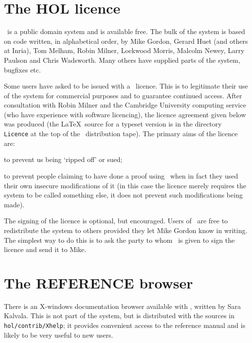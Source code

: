 {\section{The HOL licence}

\HOL\ is a public domain system and is available free. The bulk of the system
is based on code written, in alphabetical order, by Mike Gordon,
Gerard Huet (and others at Inria), Tom Melham, Robin Milner, Lockwood
Morris, Malcolm Newey, Larry Paulson and Chris Wadsworth. Many others
have supplied parts of the system, bugfixes etc.

Some users have asked to be issued with a \HOL\ licence.  This is to
legitimate their use of the system for commercial purposes and to
guarantee continued access.  After consultation with Robin Milner and
the Cambridge University computing service (who have experience with
software licencing), the licence agreement given below was produced
(the \LaTeX\ source for a typeset version is in the directory {\tt
Licence} at the top of the \HOL\ distribution tape).  The primary aims
of the licence are:

\begin{myenumerate}
\item to prevent us being `ripped off' or sued;
\item to prevent people claiming to have done a proof using \HOL\ when 
in fact they used their own insecure modifications of it 
(in this case the licence merely requires the system to be called 
something else, it does not prevent such modifications being made).
\end{myenumerate}

The signing of the licence is optional, but encouraged. Users of \HOL\ are
free to redistribute the system to others provided they let Mike Gordon know
in writing. The simplest way to do this is to ask the party to whom \HOL\ is
given to sign the licence and send it to Mike.

\section{The REFERENCE browser}

There is an X-windows documentation browser available with \HOL, written by
Sara Kalvala.  This is not part of the \HOL{} system,
but is distributed with the sources in {\small\verb+hol/contrib/Xhelp+}; it
provides convenient access to the reference manual \REFERENCE{} and is
likely to be very useful to new users.


}

